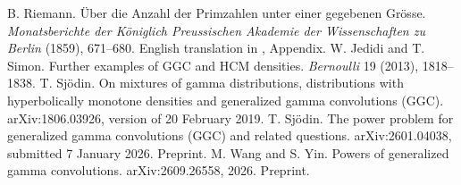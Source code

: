  B. Riemann. \"Uber die Anzahl der Primzahlen unter einer gegebenen Gr\"osse. \emph{Monatsberichte der K\"oniglich Preussischen Akademie der Wissenschaften zu Berlin} (1859), 671--680. English translation in \cite{Edwards}, Appendix. %
 W. Jedidi and T. Simon. Further examples of GGC and HCM densities. \emph{Bernoulli} 19 (2013), 1818--1838. %
 T. Sj\"odin. On mixtures of gamma distributions, distributions with hyperbolically monotone densities and generalized gamma convolutions (GGC). arXiv:1806.03926, version of 20 February 2019. %
 T. Sj\"odin. The power problem for generalized gamma convolutions (GGC) and related questions. arXiv:2601.04038, submitted 7 January 2026. Preprint. %
 M. Wang and S. Yin. Powers of generalized gamma convolutions. arXiv:2609.26558, 2026. Preprint. %
